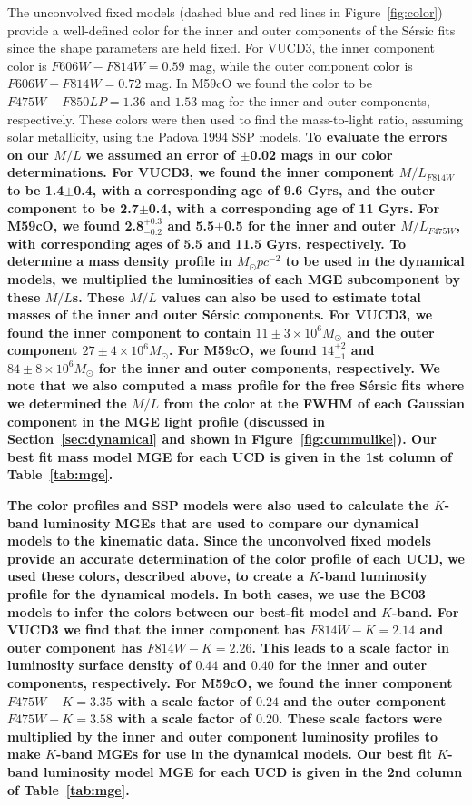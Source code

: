 \documentclass{aastex}
\begin{document}
The unconvolved fixed models (dashed blue and red lines in Figure~\ref{fig:color}) provide a well-defined color for the inner and outer components of the S\'ersic fits since the shape parameters are held fixed. For VUCD3, the inner component color is $F606W - F814W = 0.59$ mag, while the outer component color is $F606W - F814W = 0.72$ mag. In M59cO we found the color to be $F475W - F850LP = 1.36$ and $1.53$ mag for the inner and outer components, respectively. These colors were then used to find the mass-to-light ratio, assuming solar metallicity, using the \citet{bruzual03} Padova 1994 SSP models. \textbf{To evaluate the errors on our $M/L$ we assumed an error of $\pm$0.02 mags in our color determinations. For VUCD3, we found the inner component $M/L_{F814W}$ to be 1.4$\pm$0.4, with a corresponding age of 9.6 Gyrs, and the outer component to be 2.7$\pm$0.4, with a corresponding age of 11 Gyrs. For M59cO, we found 2.8$^{+0.3}_{-0.2}$ and 5.5$\pm$0.5 for the inner and outer $M/L_{F475W}$, with corresponding ages of 5.5 and 11.5 Gyrs, respectively. To determine a mass density profile in $M_\odot pc^{-2}$ to be used in the dynamical models, we multiplied the luminosities of each MGE subcomponent by these $M/L$s. These $M/L$ values can also be used to estimate total masses of the inner and outer S\'ersic components. For VUCD3, we found the inner component to contain $11 \pm 3 \times 10^6 M_\odot$ and the outer component $27 \pm 4 \times 10^6 M_\odot$. For M59cO, we found $14^{+2}_{-1}$ and $84 \pm 8 \times 10^6 M_\odot$ for the inner and outer components, respectively.  We note that we also computed a mass profile for the free S\'ersic fits where we determined the $M/L$ from the color at the FWHM of each Gaussian component in the MGE light profile (discussed in Section~\ref{sec:dynamical} and shown in Figure~\ref{fig:cummulike}).  Our best fit mass model MGE for each UCD is given in the 1st column of Table~\ref{tab:mge}.}

\textbf{The color profiles and SSP models were also used to calculate the $K$-band luminosity MGEs that are used to compare our dynamical models to the kinematic data. Since the unconvolved fixed models provide an accurate determination of the color profile of each UCD, we used these colors, described above, to create a $K$-band luminosity profile for the dynamical models. In both cases, we use the BC03 models to infer the colors between our best-fit model and $K$-band.  For VUCD3 we find that the inner component has $F814W - K = 2.14$ and outer component has $F814W - K = 2.26$.  This leads to a scale factor in luminosity surface density of $0.44$ and $0.40$ for the inner and outer components, respectively. For M59cO, we found the inner component $F475W - K =3.35$ with a scale factor of $0.24$ and the outer component $F475W - K=3.58$ with a scale factor of $0.20$. These scale factors were multiplied by the inner and outer component luminosity profiles to make $K$-band MGEs for use in the dynamical models. Our best fit $K$-band luminosity model MGE for each UCD is given in the 2nd column of Table~\ref{tab:mge}.}
\end{document}
